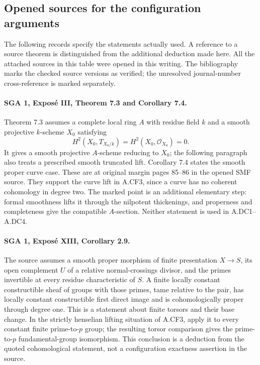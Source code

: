 \subsection{Opened sources for the configuration arguments}

The following records specify the statements actually used. A reference
to a source theorem is distinguished from the additional deduction
made here. All the attached sources in this table were opened in this
writing. The bibliography marks the checked source versions as verified;
the unresolved journal-number cross-reference is marked separately.

\paragraph{SGA 1, Expos\'e III, Theorem 7.3 and Corollary 7.4.}
Theorem 7.3 assumes a complete local ring $A$ with residue field $k$
and a smooth projective $k$-scheme $X_0$ satisfying
\[
 H^2(X_0,T_{X_0/k})=H^2(X_0,\mathcal O_{X_0})=0.
\]
It gives a smooth projective $A$-scheme reducing to $X_0$; the
following paragraph also treats a prescribed smooth truncated lift.
Corollary 7.4 states the smooth proper curve case. These are at
original margin pages 85--86 in the opened SMF source. They support
the curve lift in A.CF3, since a curve has no coherent cohomology in
degree two. The marked point is an additional elementary step:
formal smoothness lifts it through the nilpotent thickenings, and
properness and completeness give the compatible $A$-section. Neither
statement is used in A.DC1--A.DC4.

\paragraph{SGA 1, Expos\'e XIII, Corollary 2.9.}
The source assumes a smooth proper morphism of finite presentation
$X\to S$, its open complement $U$ of a relative normal-crossings
divisor, and the primes invertible at every residue characteristic of
$S$. A finite locally constant constructible sheaf of groups with
those primes, tame relative to the pair, has locally constant
constructible first direct image and is cohomologically proper through
degree one. This is a statement about finite torsors and their base
change. In the strictly henselian lifting situation of A.CF3, apply
it to every constant finite prime-to-$p$ group; the resulting torsor
comparison gives the prime-to-$p$ fundamental-group isomorphism.
This conclusion is a deduction from the quoted cohomological statement,
not a configuration exactness assertion in the source.

